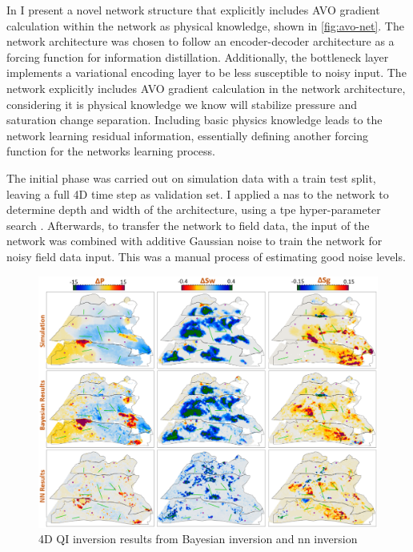 In \citet{dramsch2019physics} I present a novel network structure that explicitly includes AVO gradient calculation within the network as physical knowledge, shown in \cref{fig:avo-net}. The network architecture was chosen to follow an encoder-decoder architecture as a forcing function for information distillation. Additionally, the bottleneck layer implements a variational encoding layer to be less susceptible to noisy input. The network explicitly includes AVO gradient calculation in the network architecture, considering it is physical knowledge we know will stabilize pressure and saturation change separation. Including basic physics knowledge leads to the network learning residual information, essentially defining another forcing function for the networks learning process.

The initial phase was carried out on simulation data with a train test split, leaving a full 4D time step as validation set. I applied a \acl{nas} to the network to determine depth and width of the architecture, using a \ac{tpe} hyper-parameter search \citep{bergstra2015hyperopt}. Afterwards, to transfer the network to field data, the input of the network was combined with additive Gaussian noise \citep{bishop1995training} to train the network for noisy field data input. This was a manual process of estimating good noise levels.

\begin{figure}
    \centering
    \includegraphics[width=\textwidth]{figures/NN_results.PNG}
    \caption{4D QI inversion results from Bayesian inversion and \acl{nn} inversion}
    \label{fig:avo-net-results}
\end{figure}

